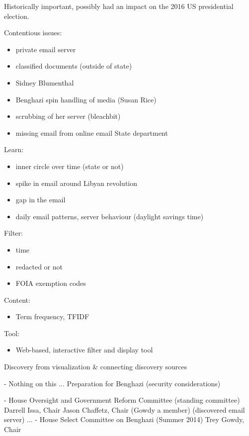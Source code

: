 \documentclass[journal]{vgtc}                %
\begin{document}
Historically important,  possibly had an impact on the 2016 US presidential election.

Contentious issues:
\begin{itemize}
\item private email server
\item classified documents (outside of state)
\item Sidney Blumenthal
\item Benghazi spin handling of media (Susan Rice)

\item scrubbing of her server (bleachbit)
\item missing email from online email State department
\end{itemize}


Learn:
\begin{itemize}
\item inner circle over time (state or not)
\item spike in email around Libyan revolution
\item gap in the email
\item daily email patterns, server behaviour (daylight savings time)
\end{itemize}

  
 Filter:
\begin{itemize}
\item time
\item redacted or not
\item FOIA exemption codes
\end{itemize}

   
 Content:
\begin{itemize}
\item Term frequency, TFIDF
\end{itemize}

   
 Tool: 
\begin{itemize}
\item Web-based, interactive filter and display tool
\end{itemize}
    
    
Discovery from visualization \& connecting discovery sources



- Nothing on this ... Preparation for Benghazi (security considerations)

- House Oversight and Government Reform Committee (standing committee) 
  Darrell Issa, Chair
     Jason Chaffetz, Chair (Gowdy a member)
  (discovered email server)
    ... 
- House Select Committee on Benghazi (Summer 2014) 
   Trey Gowdy, Chair
\end{document}
